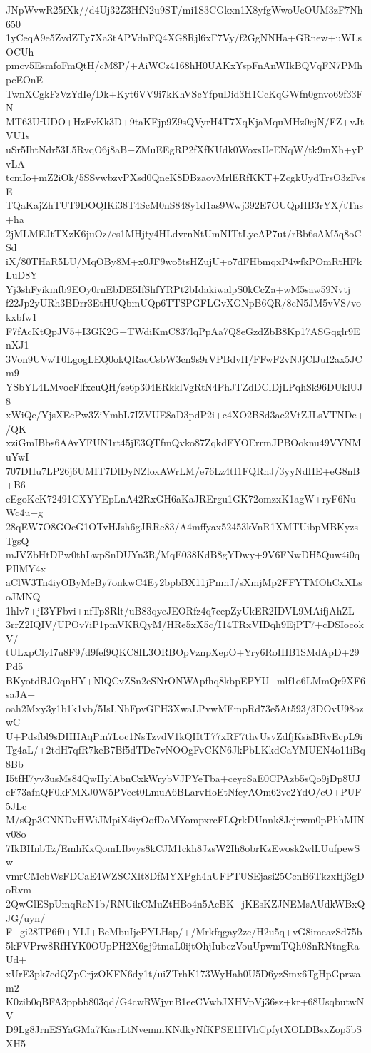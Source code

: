 JNpWvwR25fXk//d4Uj32Z3HfN2u9ST/mi1S3CGkxn1X8yfgWwoUeOUM3zF7Nh650
1yCeqA9e5ZvdZTy7Xa3tAPVdnFQ4XG8Rjl6xF7Vy/f2GgNNHa+GRnew+uWLsOCUh
pmcv5EsmfoFmQtH/cM8P/+AiWCz4168hH0UAKxYspFnAnWIkBQVqFN7PMhpcEOnE
TwnXCgkFzVzYdIe/Dk+Kyt6VV9i7kKhVScYfpuDid3H1CcKqGWfn0gnvo69f33FN
MT63UfUDO+HzFvKk3D+9taKFjp9Z9sQVyrH4T7XqKjaMquMHz0ejN/FZ+vJtVU1s
uSr5IhtNdr53L5RvqO6j8aB+ZMuEEgRP2fXfKUdk0WoxsUeENqW/tk9mXh+yPvLA
tcmIo+mZ2iOk/5SSvwbzvPXsd0QneK8DBzaovMrlERfKKT+ZcgkUydTrsO3zFvsE
TQaKajZhTUT9DOQIKi38T4ScM0nS848y1d1as9Wwj392E7OUQpHB3rYX/tTns+ha
2jMLMEJtTXzK6juOz/es1MHjty4HLdvrnNtUmNITtLyeAP7ut/rBb6sAM5q8oCSd
iX/80THaR5LU/MqOBy8M+x0JF9wo5tsHZujU+o7dFHbmqxP4wfkPOmRtHFkLuD8Y
Yj3shFyikmfb9EOy0rnEbDE5IfShfYRPt2bIdakiwalpS0kCcZa+wM5saw59Nvtj
f22Jp2yURh3BDrr3EtHUQbmUQp6TTSPGFLGvXGNpB6QR/8cN5JM5vVS/vokxbfw1
F7fAcKtQpJV5+I3GK2G+TWdiKmC837lqPpAa7Q8eGzdZbB8Kp17ASGqglr9EnXJ1
3Von9UVwT0LgogLEQ0okQRaoCsbW3cn9s9rVPBdvH/FFwF2vNJjClJuI2ax5JCm9
YSbYL4LMvocFlfxcuQH/se6p304ERkklVgRtN4PhJTZdDClDjLPqhSk96DUklUJ8
xWiQe/YjsXEcPw3ZiYmbL7IZVUE8aD3pdP2i+c4XO2BSd3ac2VtZJLsVTNDe+/QK
xziGmIBbs6AAvYFUN1rt45jE3QTfmQvko87ZqkdFYOErrmJPBOoknu49VYNMuYwI
707DHu7LP26j6UMIT7DlDyNZloxAWrLM/e76Lz4tI1FQRnJ/3yyNdHE+eG8nB+B6
cEgoKcK72491CXYYEpLnA42RxGH6aKaJRErgu1GK72omzxK1agW+ryF6NuWc4u+g
28qEW7O8GOeG1OTvHJsh6gJRRe83/A4mffyax52453kVnR1XMTUibpMBKyzsTgsQ
mJVZbHtDPw0thLwpSnDUYn3R/MqE038KdB8gYDwy+9V6FNwDH5Quw4i0qPIlMY4x
aClW3Tn4iyOByMeBy7onkwC4Ey2bpbBX11jPmnJ/sXmjMp2FFYTMOhCxXLsoJMNQ
1hlv7+jI3YFbvi+nfTpSRlt/uB83qyeJEORfz4q7cepZyUkER2IDVL9MAifjAhZL
3rrZ2IQIV/UPOv7iP1pmVKRQyM/HRe5xX5c/I14TRxVIDqh9EjPT7+cDSIocokV/
tULxpClyI7u8F9/d9fef9QKC8IL3ORBOpVznpXepO+Yry6RoIHB1SMdApD+29Pd5
BKyotdBJOqnHY+NlQCvZSn2cSNrONWApfhq8kbpEPYU+mlf1o6LMmQr9XF6saJA+
oah2Mxy3y1b1k1vb/5IsLNhFpvGFH3XwaLPvwMEmpRd73e5At593/3DOvU98ozwC
U+Pdsfbl9sDHHAqPm7Loc1NsTzvdV1kQHtT77xRF7thvUsvZdfjKsisBRvEcpL9i
Tg4aL/+2tdH7qfR7keB7Bf5dTDe7vNOOgFvCKN6JkPbLKkdCaYMUEN4o11iBq8Bb
I5tfH7yv3usMs84QwIIylAbnCxkWrybVJPYeTba+ceycSaE0CPAzb5sQo9jDp8UJ
cF73afnQF0kFMXJ0W5PVect0LmuA6BLarvHoEtNfcyAOm62ve2YdO/cO+PUF5JLc
M/sQp3CNNDvHWiJMpiX4iyOofDoMYompxrcFLQrkDUnnk8Jcjrwm0pPhhMINv08o
7IkBHnbTz/EmhKxQomLIbvys8kCJM1ckh8JzsW2Ih8obrKzEwosk2wlLUufpewSw
vmrCMcbWsFDCaE4WZSCXlt8DfMYXPgh4hUFPTUSEjasi25CcnB6TkzxHj3gDoRvm
2QwGlESpUmqReN1b/RNUikCMuZtHBo4n5AcBK+jKEsKZJNEMsAUdkWBxQJG/uyn/
F+gi28TP6f0+YLI+BeMbuIjcPYLHsp/+/Mrkfqgay2zc/H2u5q+vG8imeazSd75b
5kFVPrw8RfHYK0OUpPH2X6gj9tmaL0ijtOhjIubezVouUpwmTQh0SnRNtngRaUd+
xUrE3pk7cdQZpCrjzOKFN6dy1t/uiZTrhK173WyHah0U5D6yzSmx6TgHpGprwam2
K0zib0qBFA3ppbb803qd/G4cwRWjynB1eeCVwbJXHVpVj36sz+kr+68UsqbutwNV
D9Lg8JrnESYaGMa7KasrLtNvemmKNdkyNfKPSE1IIVhCpfytXOLDBsxZop5bSXH5
